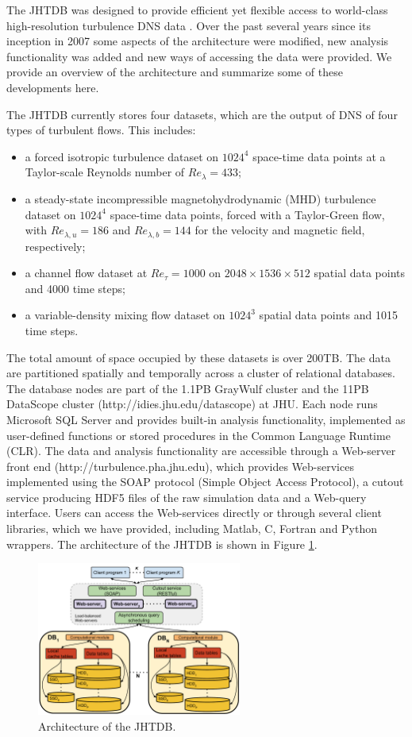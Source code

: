 \documentclass[10pt,twocolumn]{article}
\begin{document}
The JHTDB was designed to provide efficient yet flexible access to world-class high-resolution turbulence DNS data \cite{Yi, Perlman}. Over the past
several years since its inception in 2007 some aspects of the architecture were modified, new analysis functionality was added and new ways of accessing
the data were provided. We provide an overview of the architecture and summarize some of these developments here.

The JHTDB currently stores four datasets, which are the output of DNS of four types of turbulent flows. This includes: 
\begin{itemize}
\item a forced isotropic turbulence dataset on $1024^4$ space-time data points at a Taylor-scale Reynolds number of $Re_{\lambda} = 433$;
\item a steady-state incompressible magnetohydrodynamic (MHD) turbulence dataset on $1024^4$  space-time data points, forced with a Taylor-Green flow,
with $Re_{\lambda , u} = 186$  and $Re_{\lambda , b} = 144$ for the velocity and magnetic field, respectively;
\item a channel flow dataset at $Re_\tau = 1000$ on $2048 \times 1536 \times 512$ spatial data points and 4000 time steps;
\item a variable-density mixing flow dataset on $1024^3$ spatial data points and 1015 time steps.
\end{itemize}
The total amount of space occupied by these datasets is over 200TB. The data are partitioned spatially and temporally across a cluster of relational
databases. The database nodes are part of the 1.1PB GrayWulf cluster \cite{Szalay} and the 11PB DataScope cluster (http://idies.jhu.edu/datascope) at JHU.
Each node runs Microsoft SQL Server and provides built-in analysis functionality, implemented as user-defined functions or stored procedures in the
Common Language Runtime (CLR). The data and analysis functionality are accessible through a Web-server front end (http://turbulence.pha.jhu.edu), 
which provides Web-services implemented using the SOAP protocol (Simple Object Access Protocol), a cutout service producing HDF5 files of the raw
simulation data and a Web-query interface. Users can access the Web-services directly or through several client libraries, which we have provided, 
including Matlab, C, Fortran and Python wrappers. The architecture of the JHTDB is shown in Figure \ref{fig:architecture}.

\begin{figure}
\includegraphics[width=0.6\textwidth]{jhtdb_diagram.pdf}
\caption{Architecture of the JHTDB.}
\label{fig:architecture}
\end{figure}
\end{document}
